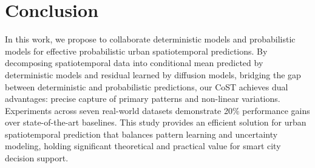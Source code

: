 \section{Conclusion}

In this work, we propose to collaborate deterministic models and probabilistic models for effective probabilistic urban spatiotemporal predictions. By decomposing spatiotemporal data into conditional mean predicted by deterministic models and residual learned by diffusion models, bridging the gap between deterministic and probabilistic predictions, our CoST achieves dual advantages: precise capture of primary patterns and non-linear variations. Experiments across seven real-world datasets demonstrate 20\% performance gains over state-of-the-art baselines. This study provides an efficient solution for urban spatiotemporal prediction that balances pattern learning and uncertainty modeling, holding significant theoretical and practical value for smart city decision support.
 